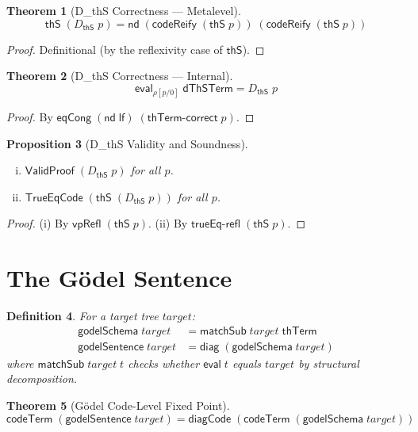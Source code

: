 \documentclass[11pt]{article}
\newtheorem{theorem}{Theorem}
\newtheorem{definition}[theorem]{Definition}
\newtheorem{proposition}[theorem]{Proposition}
\newcommand{\lf}{\mathsf{lf}}
\newcommand{\nd}{\mathsf{nd}}
\newcommand{\eval}{\mathsf{eval}}
\newcommand{\codeTerm}{\mathsf{codeTerm}}
\newcommand{\codeReify}{\mathsf{codeReify}}
\newcommand{\diagCode}{\mathsf{diagCode}}
\newcommand{\diag}{\mathsf{diag}}
\newcommand{\thS}{\mathsf{thS}}
\newcommand{\thTerm}{\mathsf{thTerm}}
\newcommand{\dThS}{D_{\thS}}
\newcommand{\ValidProof}{\mathsf{ValidProof}}
\newcommand{\TrueEqCode}{\mathsf{TrueEqCode}}
\begin{document}
\begin{theorem}[D\_thS Correctness --- Metalevel]
\[
  \thS\;(\dThS\;p) = \nd\;(\codeReify\;(\thS\;p))\;(\codeReify\;(\thS\;p))
\]
\end{theorem}
\begin{proof}
Definitional (by the reflexivity case of $\thS$).
\end{proof}

\begin{theorem}[D\_thS Correctness --- Internal]
\[
  \eval_{\rho[p/0]}\;\mathsf{dThSTerm} = \dThS\;p
\]
\end{theorem}
\begin{proof}
By $\mathsf{eqCong}\;(\nd\;\lf)\;(\mathsf{thTerm\text{-}correct}\;p)$.
\end{proof}

\begin{proposition}[D\_thS Validity and Soundness]
\mbox{}
\begin{enumerate}[(i)]
  \item $\ValidProof\;(\dThS\;p)$ for all $p$.
  \item $\TrueEqCode\;(\thS\;(\dThS\;p))$ for all $p$.
\end{enumerate}
\end{proposition}
\begin{proof}
(i) By $\mathsf{vpRefl}\;(\thS\;p)$.
(ii) By $\mathsf{trueEq\text{-}refl}\;(\thS\;p)$.
\end{proof}

\section{The G\"odel Sentence}

\begin{definition}
For a target tree $\mathit{target}$:
\begin{align*}
  \mathsf{godelSchema}\;\mathit{target} &= \mathsf{matchSub}\;\mathit{target}\;\thTerm \\
  \mathsf{godelSentence}\;\mathit{target} &= \diag\;(\mathsf{godelSchema}\;\mathit{target})
\end{align*}
where $\mathsf{matchSub}\;\mathit{target}\;t$ checks whether $\eval\;t$ equals
$\mathit{target}$ by structural decomposition.
\end{definition}

\begin{theorem}[G\"odel Code-Level Fixed Point]
\[
  \codeTerm\;(\mathsf{godelSentence}\;\mathit{target})
  = \diagCode\;(\codeTerm\;(\mathsf{godelSchema}\;\mathit{target}))
\]
\end{theorem}
\end{document}
